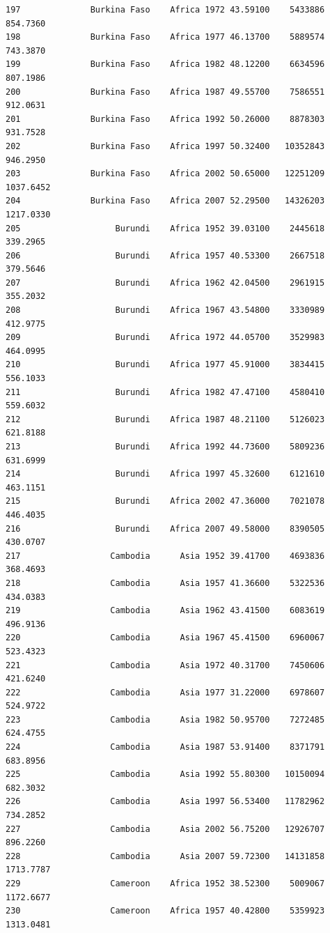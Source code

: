 \documentclass[
  letterpaper,
  DIV=11,
  numbers=noendperiod]{scrreprt}
\begin{document}
\begin{verbatim}
197              Burkina Faso    Africa 1972 43.59100    5433886    854.7360
198              Burkina Faso    Africa 1977 46.13700    5889574    743.3870
199              Burkina Faso    Africa 1982 48.12200    6634596    807.1986
200              Burkina Faso    Africa 1987 49.55700    7586551    912.0631
201              Burkina Faso    Africa 1992 50.26000    8878303    931.7528
202              Burkina Faso    Africa 1997 50.32400   10352843    946.2950
203              Burkina Faso    Africa 2002 50.65000   12251209   1037.6452
204              Burkina Faso    Africa 2007 52.29500   14326203   1217.0330
205                   Burundi    Africa 1952 39.03100    2445618    339.2965
206                   Burundi    Africa 1957 40.53300    2667518    379.5646
207                   Burundi    Africa 1962 42.04500    2961915    355.2032
208                   Burundi    Africa 1967 43.54800    3330989    412.9775
209                   Burundi    Africa 1972 44.05700    3529983    464.0995
210                   Burundi    Africa 1977 45.91000    3834415    556.1033
211                   Burundi    Africa 1982 47.47100    4580410    559.6032
212                   Burundi    Africa 1987 48.21100    5126023    621.8188
213                   Burundi    Africa 1992 44.73600    5809236    631.6999
214                   Burundi    Africa 1997 45.32600    6121610    463.1151
215                   Burundi    Africa 2002 47.36000    7021078    446.4035
216                   Burundi    Africa 2007 49.58000    8390505    430.0707
217                  Cambodia      Asia 1952 39.41700    4693836    368.4693
218                  Cambodia      Asia 1957 41.36600    5322536    434.0383
219                  Cambodia      Asia 1962 43.41500    6083619    496.9136
220                  Cambodia      Asia 1967 45.41500    6960067    523.4323
221                  Cambodia      Asia 1972 40.31700    7450606    421.6240
222                  Cambodia      Asia 1977 31.22000    6978607    524.9722
223                  Cambodia      Asia 1982 50.95700    7272485    624.4755
224                  Cambodia      Asia 1987 53.91400    8371791    683.8956
225                  Cambodia      Asia 1992 55.80300   10150094    682.3032
226                  Cambodia      Asia 1997 56.53400   11782962    734.2852
227                  Cambodia      Asia 2002 56.75200   12926707    896.2260
228                  Cambodia      Asia 2007 59.72300   14131858   1713.7787
229                  Cameroon    Africa 1952 38.52300    5009067   1172.6677
230                  Cameroon    Africa 1957 40.42800    5359923   1313.0481

\end{verbatim}
\end{document}

